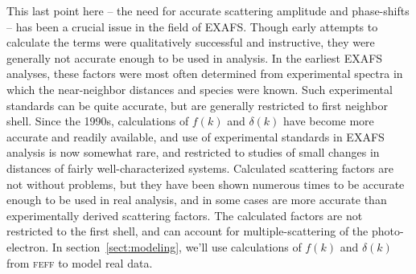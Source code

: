 This last point here -- the need for accurate scattering amplitude and
phase-shifts -- has been a crucial issue in the field of EXAFS.  Though
early attempts to calculate the terms were qualitatively successful and
instructive, they were generally not accurate enough to be used in
analysis.  In the earliest EXAFS analyses, these factors were most often
determined from experimental spectra in which the near-neighbor distances
and species were known.  Such experimental standards can be quite accurate,
but are generally restricted to first neighbor shell.  Since the 1990s,
calculations of $f(k)$ and $\delta(k)$ have become more accurate and
readily available, and use of experimental standards in EXAFS analysis is
now somewhat rare, and restricted to studies of small changes in distances
of fairly well-characterized systems.  Calculated scattering factors are not
without problems, but they have been shown numerous times to be accurate
enough to be used in real analysis, and in some cases are more accurate
than experimentally derived scattering factors.  The calculated factors are
not restricted to the first shell, and can account for multiple-scattering
of the photo-electron.  In section~{\ref{sect:modeling}}, we'll use
calculations of $f(k)$ and $\delta(k)$ from {\scshape{feff}} to model real
data.


